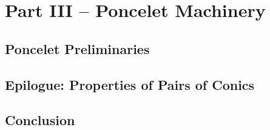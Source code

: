 \documentclass{book}
\begin{document}
\part{Part III -- Poncelet Machinery}

\chapter{Poncelet Preliminaries}
\label{chap:02-poncelet-prelims}

\chapter{Epilogue: Properties of Pairs of Conics}
\label{chap:09-conics}

\chapter{Conclusion}
\label{chap:10-conclusion}
%

\appendix

%




\end{document}
